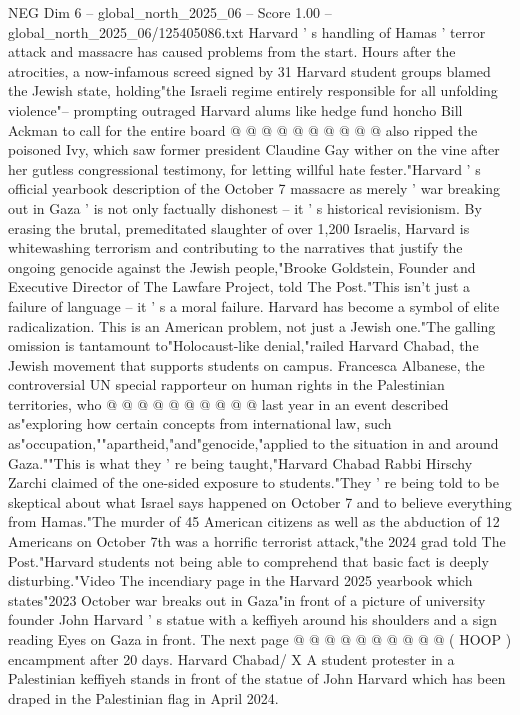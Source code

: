 \begin{textsample}{NEG Dim 6 – global\_north\_2025\_06 – Score 1.00 – global\_north\_2025\_06/125405086.txt}
Harvard ' s handling of Hamas ' terror attack and massacre has caused problems from the start.
Hours after the atrocities, a now-infamous screed signed by 31 Harvard student groups blamed the Jewish state, holding"the Israeli regime entirely responsible for all unfolding violence"-- prompting outraged Harvard alums like hedge fund honcho Bill Ackman to call for the entire board @ @ @ @ @ @ @ @ @ @ also ripped the poisoned Ivy, which saw former president Claudine Gay wither on the vine after her gutless congressional testimony, for letting willful hate fester."Harvard ' s official yearbook description of the October 7 massacre as merely ' war breaking out in Gaza ' is not only factually dishonest -- it ' s historical revisionism.
By erasing the brutal, premeditated slaughter of over 1,200 Israelis, Harvard is whitewashing terrorism and contributing to the narratives that justify the ongoing genocide against the Jewish people,"Brooke Goldstein, Founder and Executive Director of The Lawfare Project, told The Post."This isn't just a failure of language -- it ' s a moral failure.
Harvard has become a symbol of elite radicalization.
This is an American problem, not just a Jewish one."The galling omission is tantamount to"Holocaust-like denial,"railed Harvard Chabad, the Jewish movement that supports students on campus.
Francesca Albanese, the controversial UN special rapporteur on human rights in the Palestinian territories, who @ @ @ @ @ @ @ @ @ @ last year in an event described as"exploring how certain concepts from international law, such as"occupation,""apartheid,"and"genocide,"applied to the situation in and around Gaza.""This is what they ' re being taught,"Harvard Chabad Rabbi Hirschy Zarchi claimed of the one-sided exposure to students."They ' re being told to be skeptical about what Israel says happened on October 7 and to believe everything from Hamas."The murder of 45 American citizens as well as the abduction of 12 Americans on October 7th was a horrific terrorist attack,"the 2024 grad told The Post."Harvard students not being able to comprehend that basic fact is deeply disturbing."Video The incendiary page in the Harvard 2025 yearbook which states"2023 October war breaks out in Gaza"in front of a picture of university founder John Harvard ' s statue with a keffiyeh around his shoulders and a sign reading Eyes on Gaza in front.
The next page @ @ @ @ @ @ @ @ @ @ ( HOOP ) encampment after 20 days.
Harvard Chabad/ X A student protester in a Palestinian keffiyeh stands in front of the statue of John Harvard which has been draped in the Palestinian flag in April 2024.

\end{textsample}
